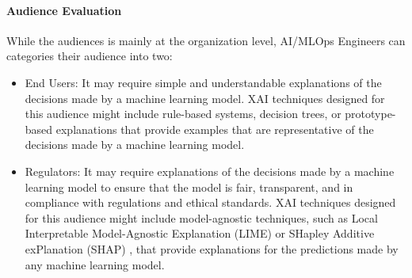 \documentclass[conference]{IEEEtran}
\begin{document}
\paragraph{Audience Evaluation} While the audiences is mainly at the organization level, AI/MLOps Engineers can categories their audience into two:
\begin{itemize}
	\item End Users: It may require simple and understandable explanations of the decisions made by a machine learning model. XAI techniques designed for this audience might include rule-based systems, decision trees, or prototype-based explanations that provide examples that are representative of the decisions made by a machine learning model.
	\item Regulators: It may require explanations of the decisions made by a machine learning model to ensure that the model is fair, transparent, and in compliance with regulations and ethical standards. XAI techniques designed for this audience might include model-agnostic techniques, such as Local Interpretable Model-Agnostic Explanation (LIME) \cite{lime} or SHapley Additive
exPlanation (SHAP) \cite{shap}, that provide explanations for the predictions made by any machine learning model.
\end{itemize}
\end{document}

